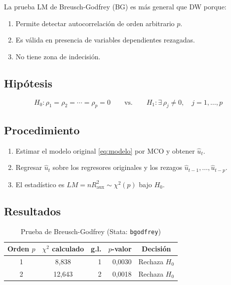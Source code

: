 \documentclass[12pt,a4paper]{article}
\newcommand{\Hcero}{H_0}
\newcommand{\Huno}{H_1}
\begin{document}
La prueba LM de Breusch-Godfrey (BG) es más general que DW porque:
\begin{enumerate}
  \item Permite detectar autocorrelación de orden arbitrario $p$.
  \item Es válida en presencia de variables dependientes rezagadas.
  \item No tiene zona de indecisión.
\end{enumerate}

\subsection{Hipótesis}

\[
  \Hcero: \rho_1 = \rho_2 = \cdots = \rho_p = 0
  \qquad\text{vs.}\qquad
  \Huno: \exists\, \rho_j \neq 0, \quad j=1,\ldots,p
\]

\subsection{Procedimiento}

\begin{enumerate}
  \item Estimar el modelo original \eqref{eq:modelo} por MCO y obtener $\hat{u}_t$.
  \item Regresar $\hat{u}_t$ sobre los regresores originales y los rezagos
        $\hat{u}_{t-1},\ldots,\hat{u}_{t-p}$.
  \item El estadístico es $LM = nR^2_{\text{aux}} \sim \chi^2(p)$ bajo $H_0$.
\end{enumerate}

\subsection{Resultados}

\begin{table}[H]
  \centering
  \caption{Prueba de Breusch-Godfrey (Stata: \texttt{bgodfrey})}
  \label{tab:bg}
  \begin{tabular}{ccrrc}
    \toprule
    Orden $p$ & $\chi^2$ calculado & g.l. & $p$-valor & Decisión \\
    \midrule
    1 & 8{,}838 & 1 & 0{,}0030 & Rechaza $H_0$ \\
    2 & 12{,}643 & 2 & 0{,}0018 & Rechaza $H_0$ \\
    \bottomrule
  \end{tabular}
\end{table}
\end{document}
